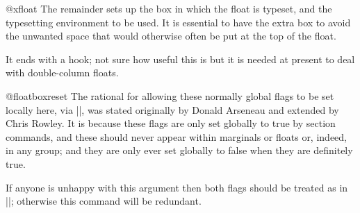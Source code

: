 \begin{docCommand}{@xfloat} {}
    The remainder sets up the box in which the float is typeset, and
    the typesetting environment to be used.  It is essential to have
    the extra box to avoid the unwanted space that would otherwise
    often be put at the top of the float.

    It ends with a hook; not sure how useful this is but it is needed
    at present to deal with double-column floats.
    \begin{teX}
  \global \setbox\@currbox
    \color@vbox
      \normalcolor
      \vbox \bgroup
        \hsize\columnwidth
        \@parboxrestore
        \@floatboxreset
}
    \end{teX}
  \end{docCommand}
%  
  \begin{docCommand}{@floatboxreset} {}
%    
 The rational for allowing these normally global flags to be set
 locally here, via |\@parboxrestore|, was stated originally by
 Donald Arseneau and extended by Chris Rowley.
 It is because these flags are only set globally to
 true by section commands, and these should never appear within
 marginals or floats or, indeed, in any group; and they are only ever
 set globally to false when they are definitely true.

 If anyone is unhappy with this argument then both flags should be
 treated as in |\set@nobreak|; otherwise this command will be
 redundant. 
    \begin{teX}
\def \@floatboxreset {%
        \reset@font
        \normalsize
        \@setminipage
}
    \end{teX}
  \end{docCommand}
